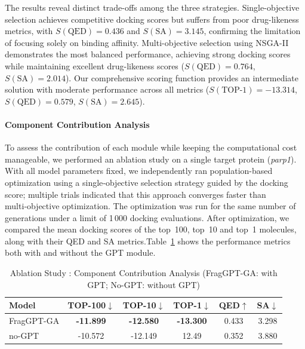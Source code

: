 \documentclass[lettersize,journal]{IEEEtran}
\begin{document}
The results reveal distinct trade-offs among the three strategies. Single-objective selection achieves competitive docking scores but suffers from poor drug-likeness metrics, with $S(\text{QED}) = 0.436$ and $S(\text{SA}) = 3.145$, confirming the limitation of focusing solely on binding affinity. Multi-objective selection using NSGA-II\cite{deb2002fast} demonstrates the most balanced performance, achieving strong docking scores while maintaining excellent drug-likeness scores ($S(\text{QED}) = 0.764$, $S(\text{SA}) = 2.014$). Our comprehensive scoring function provides an intermediate solution with moderate performance across all metrics ($S(\text{TOP-1}) = -13.314$, $S(\text{QED}) = 0.579$, $S(\text{SA}) = 2.645$).
\paragraph{Component Contribution Analysis}
To assess the contribution of each module while keeping the computational cost manageable, we performed an ablation study on a single target protein (\emph{parp1}). With all model parameters fixed, we independently ran population-based optimization using a single‑objective selection strategy guided by the docking score; multiple trials indicated that this approach converges faster than multi‑objective optimization. The optimization was run for the same number of generations under a limit of 1\,000 docking evaluations. After optimization, we compared the mean docking scores of the top~100, top~10 and top~1 molecules, along with their QED and SA metrics.Table~\ref{tab:component_ablation} shows the performance metrics both with and without the GPT module.
\begin{table}[!t]
    \caption{Ablation Study \uppercase\expandafter{}: Component Contribution Analysis (FragGPT-GA: with GPT; No-GPT: without GPT)
}
    \label{tab:component_ablation}
    \centering    
    \small
    \setlength{\tabcolsep}{4pt}    
    \begin{tabular}{l c c c c c }
        \hline\hline
        Model & TOP-100$\downarrow$ & TOP-10$\downarrow$ & TOP-1$\downarrow$ & QED$\uparrow$ & SA$\downarrow$\\
        \hline
         FragGPT-GA& \textbf{-11.899} & \textbf{-12.580} & \textbf{-13.300} & 0.433 & 3.298  \\
         no-GPT& -10.572 & -12.149 & 12.49 & 0.352 & 3.880 \\
        \hline\hline
    \end{tabular}
\end{table}
\end{document}
